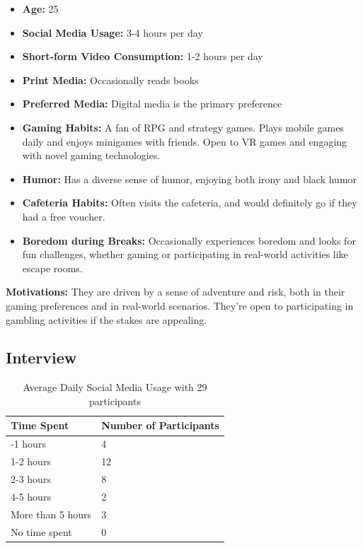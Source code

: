 \documentclass{article}
\begin{document}
\begin{itemize}
\item
  \textbf{Age:} 25
\item
  \textbf{Social Media Usage:} 3-4 hours per day
\item
  \textbf{Short-form Video Consumption:} 1-2 hours per day
\item
  \textbf{Print Media:} Occasionally reads books
\item
  \textbf{Preferred Media:} Digital media is the primary preference
\item
  \textbf{Gaming Habits:} A fan of RPG and strategy games. Plays mobile
  games daily and enjoys minigames with friends. Open to VR games and
  engaging with novel gaming technologies.
\item
  \textbf{Humor:} Has a diverse sense of humor, enjoying both irony and
  black humor
\item
  \textbf{Cafeteria Habits:} Often visits the cafeteria, and would
  definitely go if they had a free voucher.
\item
  \textbf{Boredom during Breaks:} Occasionally experiences boredom and
  looks for fun challenges, whether gaming or participating in
  real-world activities like escape rooms.
\end{itemize}

\textbf{Motivations:} They are driven by a sense of adventure and risk,
both in their gaming preferences and in real-world scenarios. They're
open to participating in gambling activities if the stakes are
appealing.

\subsection{Interview}

\begin{longtable}[]{@{}ll@{}}
\caption{Average Daily Social Media Usage with 29 participants} \label{average-daily-consumption-of-tiktok-instagram-reels-youtube-shorts} \\
\toprule\noalign{}
Time Spent & Number of Participants \\
\midrule\noalign{}
\endhead
\bottomrule\noalign{}
\endlastfoot
0-1 hours & 4 \\
1-2 hours & 12 \\
2-3 hours & 8 \\
4-5 hours & 2 \\
More than 5 hours & 3 \\
No time spent & 0 \\
\end{longtable}
\end{document}
